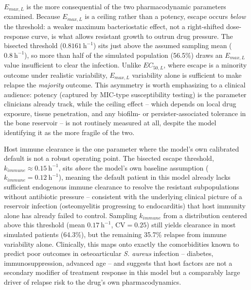 \documentclass[11pt]{article}
\begin{document}
$E_{max,L}$ is the more consequential of the two pharmacodynamic parameters
examined. Because $E_{max,L}$ is a ceiling rather than a potency, escape
occurs \emph{below} the threshold: a weaker maximum bacteriostatic effect,
not a right-shifted dose-response curve, is what allows resistant growth to
outrun drug pressure. The bisected threshold
($0.8161~\mathrm{h}^{-1}$) sits just above the assumed sampling mean
($0.8~\mathrm{h}^{-1}$), so more than half of the simulated population
(56.5\%) draws an $E_{max,L}$ value insufficient to clear the infection.
Unlike $EC_{50,L}$, where escape is a minority outcome under realistic
variability, $E_{max,L}$ variability alone is sufficient to make relapse the
\emph{majority} outcome. This asymmetry is worth emphasizing to a clinical
audience: potency (captured by MIC-type susceptibility testing) is the
parameter clinicians already track, while the ceiling effect -- which
depends on local drug exposure, tissue penetration, and any biofilm- or
persister-associated tolerance in the bone reservoir -- is not routinely
measured at all, despite the model identifying it as the more fragile of
the two.

Host immune clearance is the one parameter where the model's own calibrated
default is not a robust operating point. The bisected escape threshold,
$k_{immune} \approx 0.15~\mathrm{h}^{-1}$, sits \emph{above} the model's own
baseline assumption ($k_{immune} = 0.12~\mathrm{h}^{-1}$), meaning the
default patient in this model already lacks sufficient endogenous immune
clearance to resolve the resistant subpopulations without antibiotic
pressure -- consistent with the underlying clinical picture of a
reservoir infection (osteomyelitis progressing to endocarditis) that host
immunity alone has already failed to control. Sampling $k_{immune}$ from a
distribution centered above this threshold (mean $0.17~\mathrm{h}^{-1}$,
$\mathrm{CV}=0.25$) still yields clearance in most simulated patients
(64.3\%), but the remaining 35.7\% relapse from immune variability alone.
Clinically, this maps onto exactly the comorbidities known to predict poor
outcomes in osteoarticular \textit{S. aureus} infection -- diabetes,
immunosuppression, advanced age -- and suggests that host factors are not a
secondary modifier of treatment response in this model but a comparably
large driver of relapse risk to the drug's own pharmacodynamics.
\end{document}
